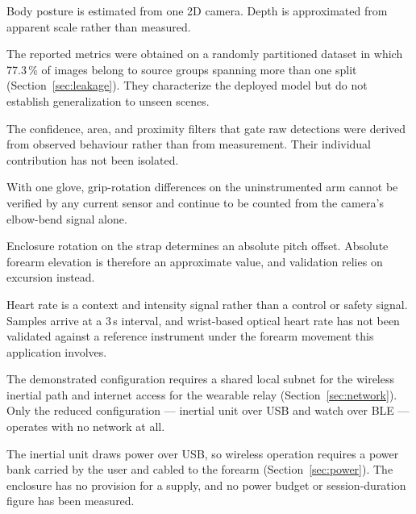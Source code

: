 \documentclass[11pt,a4paper]{article}
\begin{document}
\begin{description}[leftmargin=1.2cm,style=nextline,itemsep=4pt]
\item[Single-camera depth] Body posture is estimated from one 2D camera. Depth is
approximated from apparent scale rather than measured.

\item[Detector evaluation] The reported metrics were obtained on a randomly
partitioned dataset in which 77.3\,\% of images belong to source groups spanning
more than one split (Section~\ref{sec:leakage}). They characterize the deployed
model but do not establish generalization to unseen scenes.

\item[Unmeasured filter contribution] The confidence, area, and proximity filters
that gate raw detections were derived from observed behaviour rather than from
measurement. Their individual contribution has not been isolated.

\item[Single-side inertial verification] With one glove, grip-rotation
differences on the uninstrumented arm cannot be verified by any current sensor and
continue to be counted from the camera's elbow-bend signal alone.

\item[Mounting offset] Enclosure rotation on the strap determines an absolute
pitch offset. Absolute forearm elevation is therefore an approximate value, and
validation relies on excursion instead.

\item[Wearable latency and validity] Heart rate is a context and intensity signal
rather than a control or safety signal. Samples arrive at a 3\,s interval, and
wrist-based optical heart rate has not been validated against a reference
instrument under the forearm movement this application involves.

\item[Network dependency] The demonstrated configuration requires a shared local
subnet for the wireless inertial path and internet access for the wearable relay
(Section~\ref{sec:network}). Only the reduced configuration --- inertial unit over
USB and watch over BLE --- operates with no network at all.

\item[Carried power supply] The inertial unit draws power over USB, so wireless
operation requires a power bank carried by the user and cabled to the forearm
(Section~\ref{sec:power}). The enclosure has no provision for a supply, and no
power budget or session-duration figure has been measured.


\end{description}
\end{document}

